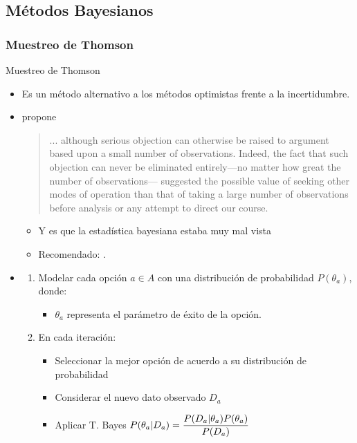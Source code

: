 \documentclass[10pt, envcountsect, handout, aspectratio=1610, hyperref={hypertexnames=true}]{beamer}
\begin{document}
\subsection{Métodos Bayesianos}



\subsubsection{Muestreo de Thomson}


\begin{frame}{Muestreo de Thomson}
\begin{itemize}
\item Es un método alternativo a los métodos optimistas frente a la incertidumbre.

\item \cite{thompson1933likelihood} propone

\begin{quote}
... although serious objection can otherwise be raised to argument
based upon a small number of observations. Indeed, the fact that such objection
can never be eliminated entirely—no matter how great the number of observations—
suggested the possible value of seeking other modes of operation than that of taking
a large number of observations before analysis or any attempt to direct our course.
\end{quote}


\begin{itemize}
\item Y es que la estadística bayesiana estaba muy mal vista 
\item Recomendado: \citet{Armero2022}.
\end{itemize}

\item {}

    \begin{enumerate}
        \item Modelar cada opción \(a \in A\) con una distribución de probabilidad \(P(\theta_a)\), donde:
        \begin{itemize}
            \item \(\theta_a\) representa el parámetro de éxito de la opción.
        \end{itemize}
        \item En cada iteración:
        \begin{itemize}
            \item Seleccionar la mejor opción de acuerdo a su distribución de probabilidad
            \item Considerar el nuevo dato observado $D_a$
            \item Aplicar T. Bayes $\displaystyle P(\theta_{a} | D_a) = \frac{P(D_a | \theta_{a}) P(\theta_{a})}{P(D_a)}$
        \end{itemize}
    \end{enumerate}



\end{itemize}
\end{frame}
\end{document}
